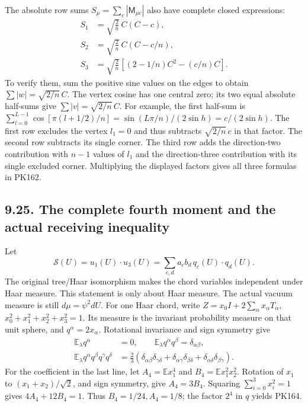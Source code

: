 \documentclass[11pt]{article}
\begin{document}
The absolute row sums \(S_\mu=\sum_c|\mathsf M_{\mu c}|\)
also have complete closed expressions:
\[
 \begin{split}
 S_1&=\sqrt{\frac2n}\,C(C-c),\\
 S_2&=\sqrt{\frac2n}\,C(C-c/n),\\
 S_3&=\sqrt{\frac2n}
              [(2-1/n)C^2-(c/n)C].
 \end{split}\tag{PK162}
\]
To verify them, sum the positive sine values on the edges to obtain
\(\sum|w|=\sqrt{2/n}\,C\). The vertex cosine has one central zero;
its two equal absolute half-sums give
\(\sum|v|=\sqrt{2/n}\,C\).
For example, the first half-sum is
\(\sum_{l=0}^{L-1}\cos[\pi(l+1/2)/n]
=\sin(L\pi/n)/(2\sin h)=c/(2\sin h)\).
The first row excludes the vertex \(l_1=0\) and thus subtracts
\(\sqrt{2/n}\,c\) in that factor. The second row subtracts its
single corner. The third row adds the direction-two contribution
with \(n-1\) values of \(l_1\) and the direction-three contribution
with its single excluded corner. Multiplying the displayed factors
gives all three formulas in PK162.

\subsection*{9.25. The complete fourth moment and the actual receiving inequality}

Let
\[
 \mathcal S(U)=u_1(U)\cdot u_3(U)
       =\sum_{c,d}a_cb_d\,q_c(U)\cdot q_d(U).
 \tag{PK163}
\]
The original tree/Haar isomorphism makes the chord variables independent
under Haar measure. This statement is only about Haar measure.
The actual vacuum measure is still \(d\mu=\psi^2dU\).
For one Haar chord, write
\(Z=x_0I+2\sum_\alpha x_\alpha T_\alpha\),
\(x_0^2+x_1^2+x_2^2+x_3^2=1\). Its measure is the invariant
probability measure on that unit sphere, and \(q^\alpha=2x_\alpha\).
Rotational invariance and sign symmetry give
\[
 \begin{split}
 \mathbb E_\lambda q^\alpha&=0,\qquad
 \mathbb E_\lambda q^\alpha q^\beta=\delta_{\alpha\beta},\\
 \mathbb E_\lambda q^\alpha q^\beta q^\gamma q^\delta
 &=\frac23(\delta_{\alpha\beta}\delta_{\gamma\delta}
          +\delta_{\alpha\gamma}\delta_{\beta\delta}
          +\delta_{\alpha\delta}\delta_{\beta\gamma}).
 \end{split}\tag{PK164}
\]
For the coefficient in the last line, let
\(A_4=\mathbb E x_1^4\) and \(B_4=\mathbb E x_1^2x_2^2\).
Rotation of \(x_1\) to \((x_1+x_2)/\sqrt2\), and sign symmetry,
give \(A_4=3B_4\). Squaring \(\sum_{i=0}^3x_i^2=1\) gives
\(4A_4+12B_4=1\). Thus \(B_4=1/24,A_4=1/8\);
the factor \(2^4\) in \(q\) yields PK164.
\end{document}
